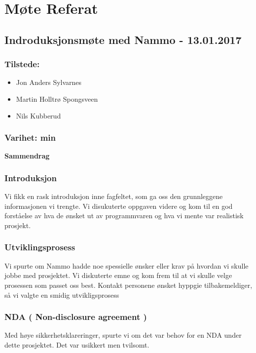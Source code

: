 \chapter{Møte Referat}

\section{Indroduksjonsmøte med Nammo - 13.01.2017}

\subsection*{Tilstede:}
\begin{multicols}{2}
\begin{itemize}
    \item Jon Anders Sylvarnes
    \item Martin Holltrø Spongsveen
    \item Nils Kubberud
\end{itemize}{}
\end{multicols}
\subsection*{\large Varihet:  min}
\textbf{\Large Sammendrag}

\subsection*{Introduksjon}
Vi fikk en rask introduksjon inne fagfeltet, som ga oss den grunnleggene informasjonen vi trengte. Vi disukuterte oppgaven videre og kom til en god forståelse av hva de ønsket ut av programmvaren og hva vi mente var realistisk prosjekt.

\subsection*{Utviklingsprosess}
Vi spurte om Nammo hadde noe spessielle ønsker eller krav på hvordan vi skulle jobbe med prosjektet. Vi diskuterte emne og kom frem til at vi skulle velge prosessen som passet oss best. Kontakt personene ønsket hyppgie tilbakemeldiger, så vi valgte en smidig utvikligsprosess

\subsection*{NDA ( Non-disclosure agreement )}
Med høye sikkerhetsklareringer, spurte vi om det var behov for en NDA under dette prosjektet. Det var usikkert men tvilsomt.

